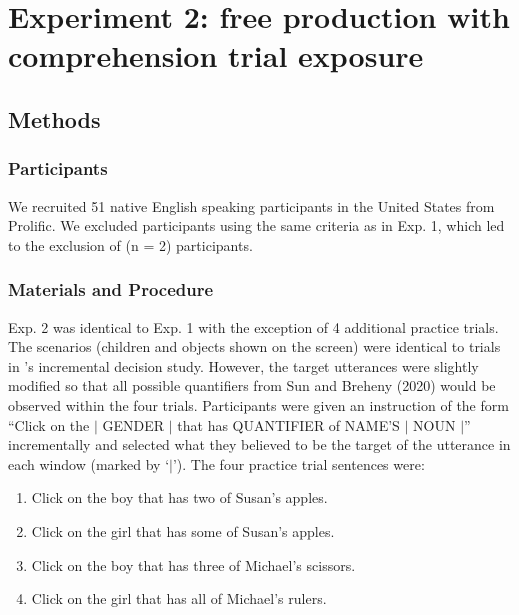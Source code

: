 \documentclass[10pt,letterpaper]{article}
\newcommand{\jd}[1]{\textcolor{Pink}{[jd: #1]}}
\begin{document}



\section{Experiment 2: free production with comprehension trial exposure}
\subsection{Methods}
\subsubsection{Participants}
We recruited 51 native English speaking participants in the United States from Prolific. We excluded participants using the same criteria as in Exp. 1, which led to the exclusion of (n = 2) participants. %

\subsubsection{Materials and Procedure}
Exp. 2 was identical to Exp. 1 with the exception of 4 additional practice trials. The scenarios (children and objects shown on the screen) were identical to  trials in 's incremental decision study. However, the target utterances were slightly modified so that all possible quantifiers from Sun and Breheny (2020) would be observed within the four trials. Participants were given an instruction of the form ``Click on the $|$ GENDER $|$ that has QUANTIFIER of NAME'S $|$  NOUN $|$'' incrementally and  selected what they believed to be the target of the utterance in each window (marked by `$|$'). %
The four practice trial sentences were: 

\begin{enumerate}
  \item Click on the boy that has two of Susan's apples.
  \item Click on the girl that has some of Susan's apples.
  \item Click on the boy that has three of Michael's scissors.
  \item Click on the girl that has all of Michael's rulers. 
\end{enumerate}
\end{document}
